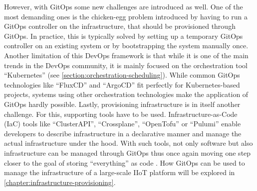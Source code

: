     However, with GitOps some new challenges are introduced as well. One of the most demanding ones is the chicken-egg problem introduced by having to run a GitOps controller on the infrastructure, that should be provisioned through GitOps. In practice, this is typically solved by setting up a temporary GitOps controller on an existing system or by bootstrapping the system manually once. Another limitation of this DevOps framework is that while it is one of the main trends in the DevOps community, it is mainly focused on the orchestration tool ``Kubernetes'' (see \autoref{section:orchestration-scheduling}). While common Git\-Ops technologies like ``FluxCD'' and ``ArgoCD'' fit perfectly for Kubernetes-based projects, systems using other orchestration technologies make the application of GitOps hardly possible. Lastly, provisioning infrastructure is in itself another challenge. For this, supporting tools have to be used. Infrastructure-as-Code (IaC) tools like ``ClusterAPI'', ``Crossplane'', ``OpenTofu'' or ``Pulumi'' enable developers to describe infrastructure in a declarative manner and manage the actual infrastructure under the hood. With such tools, not only software but also infra\-structure can be managed through GitOps thus once again moving one step closer to the goal of storing ``everything'' as code \cite{redhat_path_gitops}. How GitOps can be used to manage the infrastructure of a large-scale IIoT platform will be explored in \autoref{chapter:infrastructure-provisioning}.